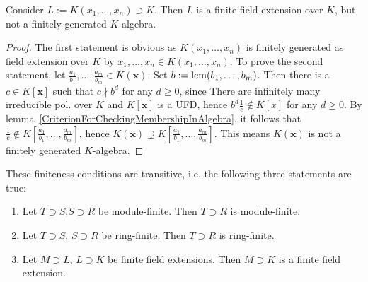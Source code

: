 \begin{proposition}\label{PolynomialQuotientFieldIsFieldFiniteNotRingFinite}
    Consider $L:= K(x_1,\dots,x_n) \supset K$. Then $L$ is a finite field extension over $K$, but not a finitely generated $K$-algebra.
\end{proposition}
\begin{proof}
    The first statement is obvious as $K(x_1,\dots,x_n)$ is finitely generated as field extension over $K$ by $x_1,\dots,x_n\in K(x_1,\dots,x_n)$. To prove the second statement, let $\frac{a_1}{b_1},\dots,\frac{a_m}{b_m}\in K(\mathbf{x})$. Set $b:=\mathrm{lcm}(b_1,\dots,b_m)$. Then there is a $c\in K[\mathbf{x}]$ such that $c\nmid b^d$ for any $d\geq 0$, since {\Large There are infinitely many irreducible pol. over $K$} and $K[\mathbf{x}]$ is a UFD, hence $b^d \frac{1}{c}\notin K[x]$ for any $d\geq 0$. By lemma~\ref{CriterionForCheckingMembershipInAlgebra}, it follows that $\frac{1}{c}\notin K\left[\frac{a_1}{b_1},\dots,\frac{a_m}{b_m}\right]$, hence $K(\mathbf{x})\supsetneq K\left[\frac{a_1}{b_1},\dots,\frac{a_m}{b_m}\right]$. This means $K(\mathbf{x})$ is not a finitely generated $K$-algebra. 
\end{proof}
\begin{lemma}
    These finiteness conditions are transitive, i.e. the following three statements are true:
    \begin{enumerate}
        \item Let $T\supset S$,$S\supset R$ be module-finite. Then $T\supset R$ is module-finite.
        \item Let $T\supset S$, $S\supset R$ be ring-finite. Then $T\supset R$ is ring-finite.
        \item Let $M\supset L$, $L\supset K$ be finite field extensions. Then $M\supset K$ is a finite field extension. 
    \end{enumerate}
\end{lemma}

